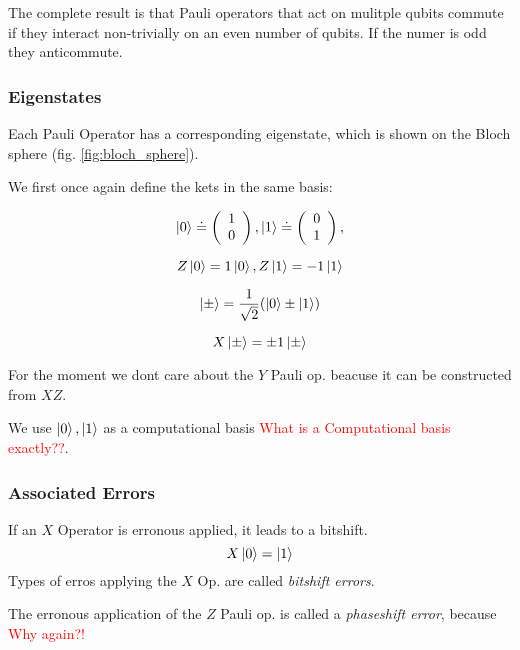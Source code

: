 The complete result is that Pauli operators that act on mulitple qubits commute if they interact non-trivially on an even number of qubits.
If the numer is odd they anticommute.


\subsubsection{Eigenstates}
Each Pauli Operator has a corresponding eigenstate, which is shown on the Bloch sphere (fig. \ref{fig:bloch_sphere}).

We first once again define the kets in the same basis:

\begin{equation}
   \ket{0}  \doteq  \left(\begin{array}{c} 1 \\ 0 \end{array}\right), \ket{1} \doteq \left(\begin{array}{c} 0 \\ 1 \end{array}\right),
\end{equation}

\begin{equation}
    Z \ket{0} = 1 \ket{0}, Z \ket{1} = -1 \ket{1}
\end{equation}

\begin{equation}
    \ket{\pm}  =  \frac{1}{\sqrt{2}}( \ket{0} \pm  \ket{1}) 
\end{equation}

\begin{equation}
   X \ket{\pm} = \pm1 \ket{\pm} 
\end{equation}

For the moment we dont care about the $Y$ Pauli op. beacuse it can be constructed from $XZ$.

We use $\ket{0},\ket{1}$ as a computational basis \textcolor{red}{What is a Computational basis exactly??}. 


\subsubsection{Associated Errors}
If an $X$ Operator is erronous applied, it leads to a bitshift. 
\begin{equation}
    X\ket{0} = \ket{1}
\end{equation}
Types of erros applying the $X$ Op. are called \textit{bitshift errors}.

The erronous application of the $Z$ Pauli op. is called a \textit{phaseshift error}, because 
\textcolor{red}{Why again?!}


